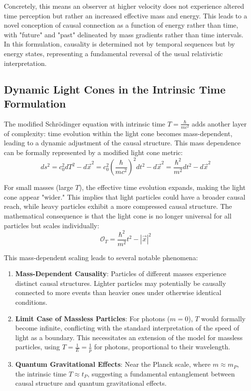 \documentclass[a4paper,12pt]{article}
\begin{document}
	Concretely, this means an observer at higher velocity does not experience altered time perception but rather an increased effective mass and energy. This leads to a novel conception of causal connection as a function of energy rather than time, with "future" and "past" delineated by mass gradients rather than time intervals. In this formulation, causality is determined not by temporal sequences but by energy states, representing a fundamental reversal of the usual relativistic interpretation.
	
	\subsection{Dynamic Light Cones in the Intrinsic Time Formulation}
	The modified Schrödinger equation with intrinsic time \( T = \frac{\hbar}{m c^2} \) adds another layer of complexity: time evolution within the light cone becomes mass-dependent, leading to a dynamic adjustment of the causal structure. This mass dependence can be formally represented by a modified light cone metric:
	\begin{equation}
		ds^2 = c_0^2 dT^2 - d\vec{x}^2 = c_0^2 \left(\frac{\hbar}{m c^2}\right)^2 dt^2 - d\vec{x}^2 = \frac{\hbar^2}{m^2} dt^2 - d\vec{x}^2
	\end{equation}
	
	For small masses (large \( T \)), the effective time evolution expands, making the light cone appear "wider." This implies that light particles could have a broader causal reach, while heavy particles exhibit a more compressed causal structure. The mathematical consequence is that the light cone is no longer universal for all particles but scales individually:
	\begin{equation}
		\mathcal{O}_T = \frac{\hbar^2}{m^2} t^2 - |\vec{x}|^2
	\end{equation}
	
	This mass-dependent scaling leads to several notable phenomena:
	
	\begin{enumerate}
		\item \textbf{Mass-Dependent Causality}: Particles of different masses experience distinct causal structures. Lighter particles may potentially be causally connected to more events than heavier ones under otherwise identical conditions.
		\item \textbf{Limit Case of Massless Particles}: For photons (\( m = 0 \)), \( T \) would formally become infinite, conflicting with the standard interpretation of the speed of light as a boundary. This necessitates an extension of the model for massless particles, using \( T = \frac{1}{E} = \frac{1}{p} \) for photons, proportional to their wavelength.
		\item \textbf{Quantum Gravitational Effects}: Near the Planck scale, where \( m \approx m_P \), the intrinsic time \( T \approx t_P \), suggesting a fundamental entanglement between causal structure and quantum gravitational effects.
	\end{enumerate}
	
\end{document}
